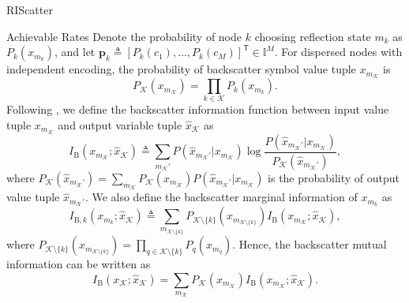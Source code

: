 \documentclass[journal]{IEEEtran}
\begin{document}
\begin{section}{RIScatter}
	\begin{subsection}{Achievable Rates}
		Denote the probability of node $k$ choosing reflection state $m_k$ as $P_k(x_{m_k})$, and let $\boldsymbol{p}_k \triangleq [P_k(c_1),\ldots,P_k(c_M)]^\mathsf{T} \in \mathbb{I}^{M}$.
		For dispersed nodes with independent encoding, the probability of backscatter symbol value tuple $x_{m_{\mathcal{K}}}$ is
		\begin{equation}
			P_{\mathcal{K}}(x_{m_{\mathcal{K}}}) = \prod_{k \in \mathcal{K}} P_k(x_{m_k}).
			\label{eq:equivalent_distribution}
		\end{equation}
		Following \cite{Rezaeian2004}, we define the backscatter information function between input value tuple $x_{m_{\mathcal{K}}}$ and output variable tuple $\hat{x}_{\mathcal{K}}$ as
		\begin{equation}
			I_{\text{B}}(x_{m_{\mathcal{K}}};\hat{x}_{\mathcal{K}}) \triangleq \sum_{m_{\mathcal{K}}'} P(\hat{x}_{m_{\mathcal{K}}'}|x_{m_{\mathcal{K}}}) \log \frac{P(\hat{x}_{m_{\mathcal{K}}'}|x_{m_{\mathcal{K}}})}{P_{\mathcal{K}}(\hat{x}_{m_{\mathcal{K}}'})},
			\label{eq:backscatter_information_function}
		\end{equation}
		where $P_{\mathcal{K}}(\hat{x}_{m_{\mathcal{K}}'}) = \sum_{m_{\mathcal{K}}} P_{\mathcal{K}}(x_{m_{\mathcal{K}}}) P(\hat{x}_{m_{\mathcal{K}}'}|x_{m_{\mathcal{K}}})$ is the probability of output value tuple $\hat{x}_{m_{\mathcal{K}}'}$.
		We also define the backscatter marginal information of $x_{m_k}$ as
		\begin{equation}
			I_{\text{B},k}(x_{m_k};\hat{x}_{\mathcal{K}}) \triangleq \sum_{m_{\mathcal{K} \setminus \{k\}}} P_{\mathcal{K} \setminus \{k\}}(x_{m_{\mathcal{K} \setminus \{k\}}}) I_{\text{B}}(x_{m_{\mathcal{K}}};\hat{x}_{\mathcal{K}}),
			\label{eq:backscatter_marginal_information}
		\end{equation}
		where $P_{\mathcal{K} \setminus \{k\}}(x_{m_{\mathcal{K} \setminus \{k\}}}) = \prod_{q \in \mathcal{K} \setminus \{k\}} P_{q}(x_{m_{q}})$.
		Hence, the backscatter mutual information can be written as
		\begin{equation}
			I_{\text{B}}(x_{\mathcal{K}};\hat{x}_{\mathcal{K}}) = \sum_{m_{\mathcal{K}}} P_{\mathcal{K}}(x_{m_{\mathcal{K}}}) I_{\text{B}}(x_{m_{\mathcal{K}}};\hat{x}_{\mathcal{K}}).
			\label{eq:backscatter_mutual_information}
		\end{equation}


\end{subsection}
\end{section}
\end{document}
